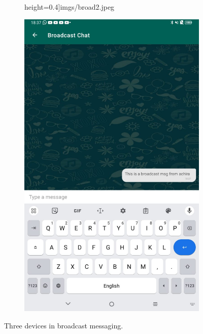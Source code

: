 \begin{figure}
\begin{subfigure}[b]{0.3\textwidth}
            height=0.4\textheight]{imgs/broad2.jpeg}
        \label{broad:2}
    \end{subfigure}
    \hspace{1cm}
    \begin{subfigure}[b]{0.4\textwidth}
        \includegraphics[width=\textwidth,
            height=0.4\textheight]{imgs/broad3.jpeg}
        \label{broad:3}
    \end{subfigure}
    \caption{Three devices in broadcast messaging.}
    \label{broad}
\end{figure}

